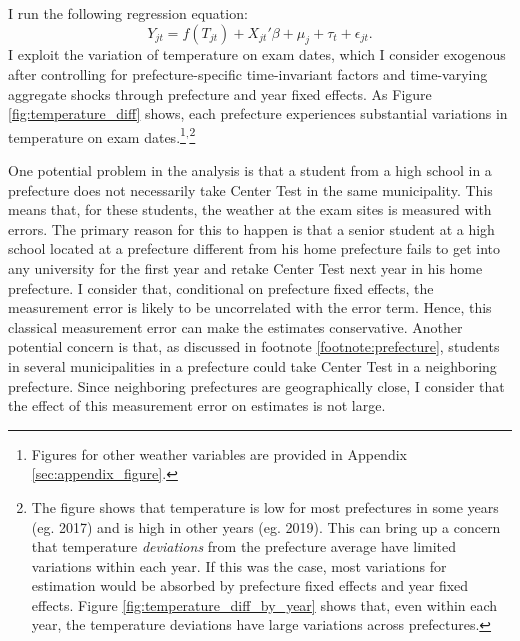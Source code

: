 \documentclass[12pt,letterpaper]{article}
\begin{document}
I run the following regression equation:
\begin{equation*}
  Y_{jt} = f(T_{jt}) + X_{jt}' \beta + \mu_j + \tau_t + \epsilon_{jt}.
\end{equation*}
I exploit the variation of temperature on exam dates, which I consider exogenous after controlling for prefecture-specific time-invariant factors and time-varying aggregate shocks through prefecture and year fixed effects.
As Figure \ref{fig:temperature_diff} shows, each prefecture experiences substantial variations in temperature on exam dates.\footnote{
  Figures for other weather variables are provided in Appendix \ref{sec:appendix_figure}.
}$^,$\footnote{
  The figure shows that temperature is low for most prefectures in some years (eg. 2017) and is high in other years (eg. 2019).
  This can bring up a concern that temperature \textit{deviations} from the prefecture average have limited variations within each year.
  If this was the case, most variations for estimation would be absorbed by prefecture fixed effects and year fixed effects.
  Figure \ref{fig:temperature_diff_by_year} shows that, even within each year, the temperature deviations have large variations across prefectures.
}

One potential problem in the analysis is that a student from a high school in a prefecture does not necessarily take Center Test in the same municipality.
This means that, for these students, the weather at the exam sites is measured with errors.
The primary reason for this to happen is that a senior student at a high school located at a prefecture different from his home prefecture fails to get into any university for the first year and retake Center Test next year in his home prefecture.
I consider that, conditional on prefecture fixed effects, the measurement error is likely to be uncorrelated with the error term.
Hence, this classical measurement error can make the estimates conservative.
Another potential concern is that, as discussed in footnote \ref{footnote:prefecture}, students in several municipalities in a prefecture could take Center Test in a neighboring prefecture.
Since neighboring prefectures are geographically close, I consider that the effect of this measurement error on estimates is not large.
\end{document}
